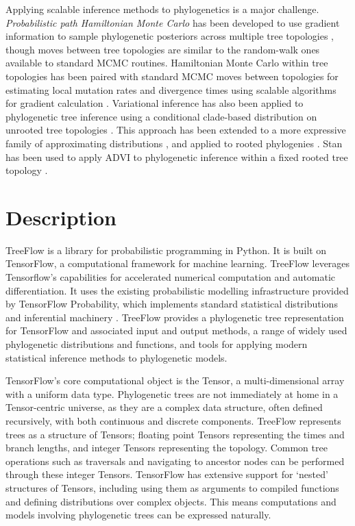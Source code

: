 Applying scalable inference methods to phylogenetics is a major challenge. \textit{Probabilistic path Hamiltonian Monte Carlo} has been developed to use gradient information to sample phylogenetic posteriors across multiple tree topologies \cite{dinh2017probabilistic}, though moves between tree topologies are similar to the random-walk ones available to standard MCMC routines. Hamiltonian Monte Carlo within tree topologies has been paired with standard MCMC moves between topologies for estimating local mutation rates and divergence times using scalable algorithms for gradient calculation \cite{ji2021scalable, fisher2021shrinkage}. Variational inference has also been applied to phylogenetic tree inference using a conditional clade-based distribution on unrooted tree topologies \cite{zhang2018variational}. This approach has been extended to a more expressive family of approximating distributions \cite{zhang2020improved}, and applied to rooted phylogenies \cite{zhang2022variational}. Stan has been used to apply ADVI to phylogenetic inference within a fixed rooted tree topology \cite{fourment2019evaluating}.

\section{Description}

TreeFlow is a library for probabilistic programming in Python. It is built on TensorFlow, a computational framework for machine learning. TreeFlow leverages Tensorflow's capabilities for accelerated numerical computation and automatic differentiation. It uses the existing probabilistic modelling infrastructure provided by TensorFlow Probability, which implements standard statistical distributions and inferential machinery \cite{dillon2017tensorflow}. TreeFlow provides a phylogenetic tree representation for TensorFlow and associated input and output methods, a range of widely used phylogenetic distributions and functions, and tools for applying modern statistical inference methods to phylogenetic models.

TensorFlow's core computational object is the Tensor, a multi-dimensional array with a uniform data type. Phylogenetic trees are not immediately at home in a Tensor-centric universe, as they are a complex data structure, often defined recursively, with both continuous and discrete components. TreeFlow represents trees as a structure of Tensors; floating point Tensors representing the times and branch lengths, and integer Tensors representing the topology. Common tree operations such as traversals and navigating to ancestor nodes can be performed through these integer Tensors. TensorFlow has extensive support for `nested' structures of Tensors, including using them as arguments to compiled functions and defining distributions over complex objects. This means computations and models involving phylogenetic trees can be expressed naturally.

